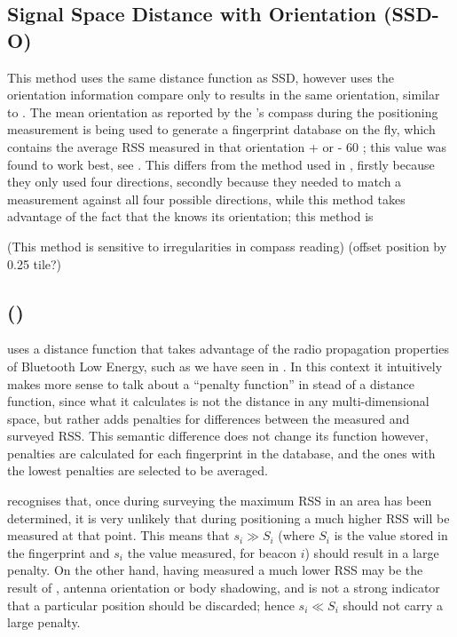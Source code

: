 \subsection{Signal Space Distance with Orientation (SSD-O)}
This method uses the same distance function as SSD, however uses the orientation information compare only to results in the same orientation, similar to \citet{king2006compass}.
The mean orientation as reported by the \device's compass during the positioning measurement is being used to generate a fingerprint database on the fly, which contains the average RSS measured in that orientation + or - 60 \textdegree{}; this value was found to work best, see .
This differs from the method used in \citet{bahl2000radar}, firstly because they only used four directions, secondly because they needed to match a measurement against all four possible directions, while this method takes advantage of the fact that the \device knows its orientation; this method is 

(This method is sensitive to irregularities in compass reading)
(offset position by 0.25 tile?)

\subsection{\BRP (\aBRP)}
\BRP uses a distance function that takes advantage of the radio propagation properties of Bluetooth Low Energy, such as we have seen in .
In this context it intuitively makes more sense to talk about a ``penalty function'' in stead of a distance function, since what it calculates is not the distance in any multi-dimensional space, but rather adds penalties for differences between the measured and surveyed RSS.
This semantic difference does not change its function however, penalties are calculated for each fingerprint in the database, and the ones with the lowest penalties are selected to be averaged.

\BRP recognises that, once during surveying the maximum RSS in an area has been determined, it is very unlikely that during positioning a much higher RSS will be measured at that point.
This means that $s_i \gg S_i$ (where $S_i$ is the value stored in the fingerprint and $s_i$ the value measured, for beacon $i$) should result in a large penalty.
On the other hand, having measured a much lower RSS may be the result of \mpi, antenna orientation or body shadowing, and is not a strong indicator that a particular position should be discarded; hence $s_i \ll S_i$ should not carry a large penalty.

